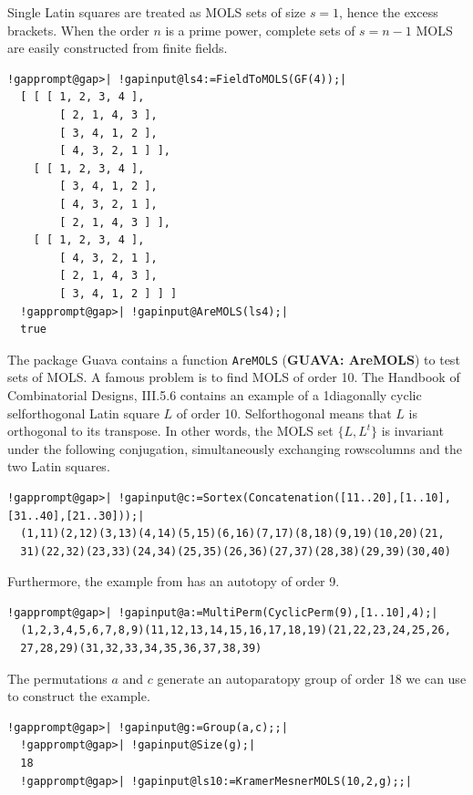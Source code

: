 \documentclass[a4paper,11pt]{report}
\begin{document}
{{ Single Latin squares are treated as MOLS sets of size $s=1$, hence the excess brackets. When the order $n$ is a prime power, complete sets of $s=n-1$ MOLS are easily constructed from finite fields. 
\begin{Verbatim}[commandchars=!@|,fontsize=\small,frame=single,label=Example]
  !gapprompt@gap>| !gapinput@ls4:=FieldToMOLS(GF(4));|
  [ [ [ 1, 2, 3, 4 ], 
        [ 2, 1, 4, 3 ], 
        [ 3, 4, 1, 2 ], 
        [ 4, 3, 2, 1 ] ], 
    [ [ 1, 2, 3, 4 ], 
        [ 3, 4, 1, 2 ], 
        [ 4, 3, 2, 1 ], 
        [ 2, 1, 4, 3 ] ], 
    [ [ 1, 2, 3, 4 ], 
        [ 4, 3, 2, 1 ], 
        [ 2, 1, 4, 3 ], 
        [ 3, 4, 1, 2 ] ] ]
  !gapprompt@gap>| !gapinput@AreMOLS(ls4);|
  true
\end{Verbatim}
 The package \textsf{Guava} contains a function \texttt{AreMOLS} (\textbf{GUAVA: AreMOLS}) to test sets of MOLS. A famous problem is to find MOLS of order 10. The
Handbook of Combinatorial Designs{\nobreakspace}\cite{CD07}, III.5.6 contains an example of a 1\texttt{}diagonally cyclic
self\texttt{}orthogonal Latin square $L$ of order 10. Self\texttt{}orthogonal means that $L$ is orthogonal to its transpose. In other words, the MOLS set $\{L,L^t\}$ is invariant under the following conjugation, simultaneously exchanging
rows{\textendash}columns and the two Latin squares. 
\begin{Verbatim}[commandchars=!@|,fontsize=\small,frame=single,label=Example]
  !gapprompt@gap>| !gapinput@c:=Sortex(Concatenation([11..20],[1..10],[31..40],[21..30]));|
  (1,11)(2,12)(3,13)(4,14)(5,15)(6,16)(7,17)(8,18)(9,19)(10,20)(21,
  31)(22,32)(23,33)(24,34)(25,35)(26,36)(27,37)(28,38)(29,39)(30,40)
\end{Verbatim}
 Furthermore, the example from{\nobreakspace}\cite{CD07} has an autotopy of order 9. 
\begin{Verbatim}[commandchars=!@|,fontsize=\small,frame=single,label=Example]
  !gapprompt@gap>| !gapinput@a:=MultiPerm(CyclicPerm(9),[1..10],4);|
  (1,2,3,4,5,6,7,8,9)(11,12,13,14,15,16,17,18,19)(21,22,23,24,25,26,
  27,28,29)(31,32,33,34,35,36,37,38,39)
\end{Verbatim}
 The permutations $a$ and $c$ generate an autoparatopy group of order 18 we can use to construct the
example. 
\begin{Verbatim}[commandchars=!@|,fontsize=\small,frame=single,label=Example]
  !gapprompt@gap>| !gapinput@g:=Group(a,c);;|
  !gapprompt@gap>| !gapinput@Size(g);|
  18
  !gapprompt@gap>| !gapinput@ls10:=KramerMesnerMOLS(10,2,g);;|

\end{Verbatim}}}
\end{document}
